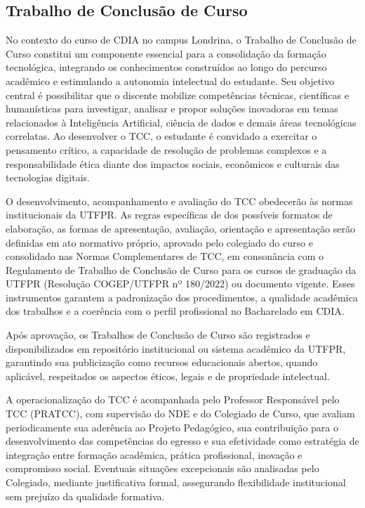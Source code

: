 \subsection{Trabalho de Conclusão de Curso}

No contexto do curso de CDIA no campus Londrina, o Trabalho de Conclusão de Curso constitui um componente essencial para a consolidação da formação tecnológica, integrando os conhecimentos construídos ao longo do percurso acadêmico e estimulando a autonomia intelectual do estudante. Seu objetivo central é possibilitar que o discente mobilize competências técnicas, científicas e humanísticas para investigar, analisar e propor soluções inovadoras em temas relacionados à Inteligência Artificial, ciência de dados e demais áreas tecnológicas correlatas. Ao desenvolver o TCC, o estudante é convidado a exercitar o pensamento crítico, a capacidade de resolução de problemas complexos e a responsabilidade ética diante dos impactos sociais, econômicos e culturais das tecnologias digitais.

O desenvolvimento, acompanhamento e avaliação do TCC obedecerão às normas institucionais da UTFPR. As regras específicas de dos possíveis formatos de elaboração, as formas de apresentação, avaliação, orientação e apresentação serão definidas em ato normativo próprio, aprovado pelo colegiado do curso e consolidado nas Normas Complementares de TCC, em consonância com o Regulamento de Trabalho de Conclusão de Curso para os cursos de graduação da UTFPR (Resolução COGEP/UTFPR nº 180/2022) \cite{UTFPR_TCC_2018} ou documento vigente. Esses instrumentos garantem a padronização dos procedimentos, a qualidade acadêmica dos trabalhos e a coerência com o perfil profissional no Bacharelado em CDIA.

Após aprovação, os Trabalhos de Conclusão de Curso são registrados e disponibilizados em repositório institucional ou sistema acadêmico da UTFPR, garantindo sua publicização como recursos educacionais abertos, quando aplicável, respeitados os aspectos éticos, legais e de propriedade intelectual.

A operacionalização do TCC é acompanhada pelo Professor Responsável pelo TCC (PRATCC), com supervisão do NDE e do Colegiado de Curso, que avaliam periodicamente sua aderência ao Projeto Pedagógico, sua contribuição para o desenvolvimento das competências do egresso e sua efetividade como estratégia de integração entre formação acadêmica, prática profissional, inovação e compromisso social. Eventuais situações excepcionais são analisadas pelo Colegiado, mediante justificativa formal, assegurando flexibilidade institucional sem prejuízo da qualidade formativa.

